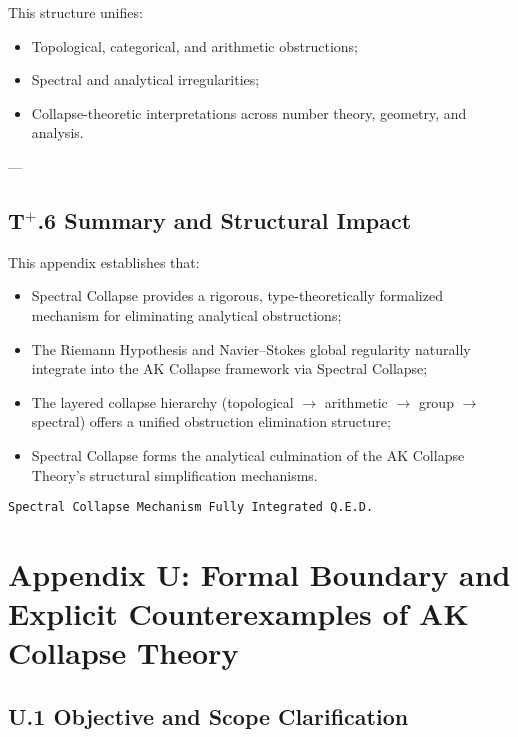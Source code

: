 \documentclass[11pt]{article}
\begin{document}
This structure unifies:
\begin{itemize}
    \item Topological, categorical, and arithmetic obstructions;
    \item Spectral and analytical irregularities;
    \item Collapse-theoretic interpretations across number theory, geometry, and analysis.
\end{itemize}

---

\subsection*{T$^{+}$.6 Summary and Structural Impact}

This appendix establishes that:
\begin{itemize}
    \item Spectral Collapse provides a rigorous, type-theoretically formalized mechanism for eliminating analytical obstructions;
    \item The Riemann Hypothesis and Navier--Stokes global regularity naturally integrate into the AK Collapse framework via Spectral Collapse;
    \item The layered collapse hierarchy (topological $\to$ arithmetic $\to$ group $\to$ spectral) offers a unified obstruction elimination structure;
    \item Spectral Collapse forms the analytical culmination of the AK Collapse Theory's structural simplification mechanisms.
\end{itemize}

\begin{flushright}
\texttt{Spectral Collapse Mechanism \quad Fully Integrated \quad Q.E.D.}
\end{flushright}




\section*{Appendix U: Formal Boundary and Explicit Counterexamples of AK Collapse Theory}

\subsection*{U.1 Objective and Scope Clarification}
\end{document}
